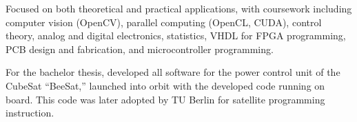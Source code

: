 \documentclass[8pt]{mofiicv}
\begin{document}
\begin{minipage}[T]{\SecondColumnWidth}
\begin{entrylist}
{			Focused on both theoretical and practical applications, with coursework including computer vision (OpenCV), parallel computing (OpenCL, CUDA), control theory, analog and digital electronics, statistics, VHDL for FPGA programming, PCB design and fabrication, and microcontroller programming.

			For the bachelor thesis, developed all software for the power control unit of the CubeSat ``BeeSat,'' launched into orbit with the developed code running on board. This code was later adopted by TU Berlin for satellite programming instruction.}
	\end{entrylist}
	\end{minipage}
	
\end{document}
